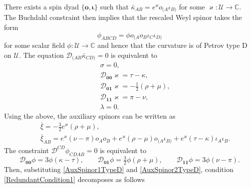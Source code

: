 \documentclass[10pt,a4paper]{article}
\newcommand\omicron{o}
\theoremstyle{plain}
\begin{document}
There exists a spin dyad $\lbrace \bm\omicron, \bm\iota\rbrace$ such
that $\bar{\kappa}_{AB} = e^{\varkappa} \omicron_{(A}\iota_{B)}$ for
some $\varkappa:\mathcal{U}\rightarrow\mathbb{C}$. The Buchdahl
constraint then implies that the rescaled Weyl spinor takes the form
\[ \phi_{ABCD}= \phi \omicron_{(A}\omicron_B\iota_C\iota_{D)}\]
for some scalar field $\phi:\mathcal{U}\rightarrow\mathbb{C}$ and
hence that the curvature is of Petrov type D on $\mathcal{U}$. The
equation $\mathcal{D}_{(AB}\bar{\kappa}_{CD)}=0$ is equivalent to
\begin{subequations}
\begin{eqnarray}
&& \sigma=0,\label{SpatialSenTypeD0000}\\
&& \mathcal{D}_{\bm0\bm0}\varkappa = \tau - \kappa, \label{SpatialSenTypeD0001}\\
&& \mathcal{D}_{\bm0\bm1}\varkappa = -\tfrac{1}{2} (\rho+\mu),\label{SpatialSenTypeD0011}\\
&& \mathcal{D}_{\bm1\bm1}\varkappa = \pi - \nu, \label{SpatialSenTypeD0111}\\
&& \lambda = 0.\label{SpatialSenTypeD1111}
\end{eqnarray}
\end{subequations}
Using the above, the auxiliary spinors can be written as 
\begin{subequations}
\begin{eqnarray} 
&& \bar{\xi} =-\tfrac{3}{2}e^{\varkappa}(\rho+\mu), \label{AuxSpinor1TypeD}\\
&& \bar{\xi}_{AB} = e^{\varkappa} (\nu - \pi) o_{A} o_{B} + e^{\varkappa}(\rho-\mu) o_{(A}\iota_{B)} + e^{\varkappa} (\tau - \kappa) \iota_{A} \iota_{B}. \label{AuxSpinor2TypeD}
\end{eqnarray}
\end{subequations}
The constraint $\mathcal{D}^{CD}\phi_{CDAB}=0$ is equivalent to 
\begin{equation}\label{WeylConstraintTypeD}
  \mathcal{D}_{\bm0\bm0}\phi = 3 \phi(\kappa - \tau), \qquad 
  \mathcal{D}_{\bm0\bm1}\phi = \tfrac{3}{2}\phi(\rho + \mu), \qquad
  \mathcal{D}_{\bm1\bm1}\phi = 3\phi (\nu  - \pi). 
\end{equation}
Then, substituting \eqref{AuxSpinor1TypeD} and \eqref{AuxSpinor2TypeD}, condition \eqref{RedundantCondition1} decomposes as follows
\end{document}
